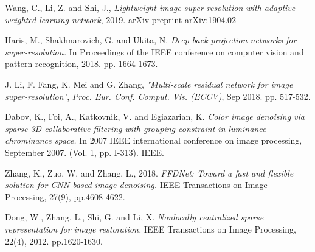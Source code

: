 \documentclass[journal]{IEEEtran}
\begin{document}
\begin{thebibliography}{00}
 Wang, C., Li, Z. and Shi, J., \textit{Lightweight image super-resolution with adaptive weighted learning network}, 2019. arXiv preprint arXiv:1904.02

 Haris, M., Shakhnarovich, G. and Ukita, N. \textit{Deep back-projection networks for super-resolution.} In Proceedings of the IEEE conference on computer vision and pattern recognition, 2018. pp. 1664-1673.

 J. Li, F. Fang, K. Mei and G. Zhang, \textit{"Multi-scale residual network for image super-resolution"}, \textit{Proc. Eur. Conf. Comput. Vis. (ECCV)}, Sep 2018. pp. 517-532.

 Dabov, K., Foi, A., Katkovnik, V. and Egiazarian, K. \textit{Color image denoising via sparse 3D collaborative filtering with grouping constraint in luminance-chrominance space.} In 2007 IEEE international conference on image processing, September 2007. (Vol. 1, pp. I-313). IEEE.

 Zhang, K., Zuo, W. and Zhang, L., 2018. \textit{FFDNet: Toward a fast and flexible solution for CNN-based image denoising.} IEEE Transactions on Image Processing, 27(9), pp.4608-4622.

 Dong, W., Zhang, L., Shi, G. and Li, X. \textit{Nonlocally centralized sparse representation for image restoration.} IEEE Transactions on Image Processing, 22(4),  2012. pp.1620-1630.

\end{thebibliography}
\end{document}
